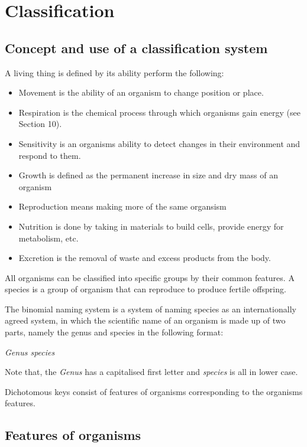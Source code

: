 \section{Classification}
\subsection{Concept and use of a classification system}

A living thing is defined by its ability perform the following:
\begin{itemize}
	\item Movement is the ability of an organism to change position or place.
	\item Respiration is the chemical process through which organisms gain energy (see Section 10).
	\item Sensitivity is an organisms ability to detect changes in their environment and respond
		to them.
	\item Growth is defined as the permanent increase in size and dry mass of an organism
	\item Reproduction means making more of the same organsism
	\item Nutrition is done by taking in materials to build cells, provide energy for metabolism,
		etc.
	\item Excretion is the removal of waste and excess products from the body.
\end{itemize}

All organisms can be classified into specific groups by their common features. A species is a group
of organism that can reproduce to produce fertile offspring.

The binomial naming system is a system of naming species as an internationally agreed system, in
which the scientific name of an organism is made up of two parts, namely the genus and species
in the following format:
\begin{center}
	\textit{Genus species}
\end{center}
Note that, the \textit{Genus} has a capitalised first letter and \textit{species} is all in lower 
case.

Dichotomous keys consist of features of organisms corresponding to the organisms features.

\subsection{Features of organisms}

